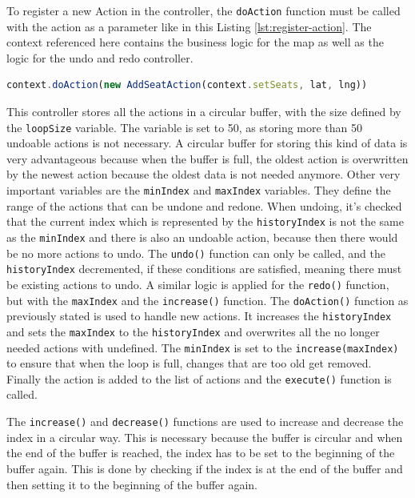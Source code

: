 To register a new Action in the controller, the \texttt{doAction} function must be called with the action as a parameter like in this Listing \ref{lst:register-action}. The context referenced here contains the business logic for the map as well as the logic for the undo and redo controller.

\begin{lstlisting}[language=TypeScript,caption={Registering a new action in the controller},label={lst:register-action}]
context.doAction(new AddSeatAction(context.setSeats, lat, lng))
\end{lstlisting}

This controller stores all the actions in a circular buffer, with the size defined by the \texttt{loopSize} variable. The variable is set to 50, as storing more than 50 undoable actions is not necessary. A circular buffer for storing this kind of data is very advantageous because when the buffer is full, the oldest action is overwritten by the newest action because the oldest data is not needed anymore. Other very important variables are the \texttt{minIndex} and \texttt{maxIndex} variables. They define the range of the actions that can be undone and redone. When undoing, it's checked that the current index which is represented by the \texttt{historyIndex} is not the same as the \texttt{minIndex} and there is also an undoable action, because then there would be no more actions to undo. The \texttt{undo()} function can only be called, and the \texttt{historyIndex} decremented, if these conditions are satisfied, meaning there must be existing actions to undo. A similar logic is applied for the \texttt{redo()} function, but with the \texttt{maxIndex} and the \texttt{increase()} function. The \texttt{doAction()} function as previously stated is used to handle new actions. It increases the \texttt{historyIndex} and sets the \texttt{maxIndex} to the \texttt{historyIndex} and overwrites all the no longer needed actions with undefined. The \texttt{minIndex} is set to the \texttt{increase(maxIndex)} to ensure that when the loop is full, changes that are too old get removed. Finally the action is added to the list of actions and the \texttt{execute()} function is called.

The \texttt{increase()} and \texttt{decrease()} functions are used to increase and decrease the index in a circular way. This is necessary because the buffer is circular and when the end of the buffer is reached, the index has to be set to the beginning of the buffer again. This is done by checking if the index is at the end of the buffer and then setting it to the beginning of the buffer again.

